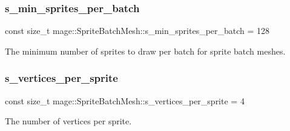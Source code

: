 \subsubsection{\texorpdfstring{s\+\_\+min\+\_\+sprites\+\_\+per\+\_\+batch}{s\_min\_sprites\_per\_batch}}
{\footnotesize\ttfamily const size\+\_\+t mage\+::\+Sprite\+Batch\+Mesh\+::s\+\_\+min\+\_\+sprites\+\_\+per\+\_\+batch = 128\hspace{0.3cm}{\ttfamily [static]}}

The minimum number of sprites to draw per batch for sprite batch meshes. \hypertarget{classmage_1_1_sprite_batch_mesh_a089a9cf9b57f43274bb2542b3c30dd55}{}\label{classmage_1_1_sprite_batch_mesh_a089a9cf9b57f43274bb2542b3c30dd55} 
\subsubsection{\texorpdfstring{s\+\_\+vertices\+\_\+per\+\_\+sprite}{s\_vertices\_per\_sprite}}
{\footnotesize\ttfamily const size\+\_\+t mage\+::\+Sprite\+Batch\+Mesh\+::s\+\_\+vertices\+\_\+per\+\_\+sprite = 4\hspace{0.3cm}{\ttfamily [static]}}

The number of vertices per sprite. 